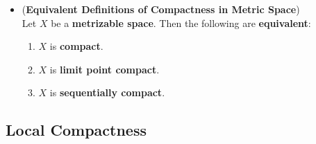 \documentclass[11pt]{article}
\begin{document}
\begin{itemize}
\item \begin{theorem} (\textbf{Equivalent Definitions of Compactness in Metric Space}) \citep{munkres2000topology}\\
Let $X$ be a \textbf{metrizable space}. Then the following are \textbf{equivalent}:
\begin{enumerate}
\item $X$ is \textbf{compact}.
\item $X$ is \textbf{limit point compact}.
\item $X$ is \textbf{sequentially compact}.
\end{enumerate}
\end{theorem}
\end{itemize}
\subsection{Local Compactness}
\end{document}
